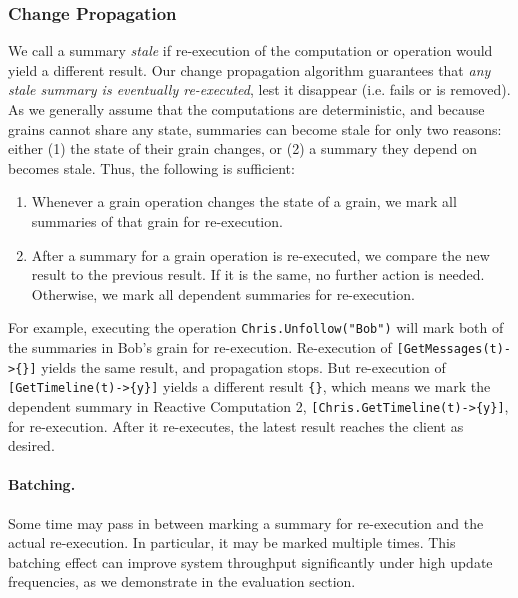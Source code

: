 \subsubsection{Change Propagation}\label{sec:cp}

We call a summary \emph{stale} if re-execution of the computation or operation would yield a different result. Our change propagation algorithm guarantees that \emph{any stale summary is eventually re-executed}, lest it disappear (i.e. fails or is removed). As we generally assume that the computations are deterministic, and because grains cannot share any state, summaries can become stale for only two reasons: either (1) the state of their grain changes, or (2) a summary they depend on becomes stale. Thus, the following is sufficient:
\begin{enumerate}
\item Whenever a grain operation changes the state of a grain, we mark all summaries of that grain for re-execution.
\item After a summary for a grain operation is re-executed, we compare the new result to the previous result. If it is the same, no further action is needed. Otherwise, we mark all dependent summaries for re-execution.
\end{enumerate}
 
\noindent For example, executing the operation \lstinline|Chris.Unfollow("Bob")| will mark both of the summaries in Bob's grain for re-execution. Re-execution of \lstinline|[GetMessages(t)->{}]| yields the same result, and propagation stops. But re-execution of \lstinline|[GetTimeline(t)->{y}]| yields a different result \lstinline|{}|, which means we mark the dependent summary in Reactive Computation 2, \lstinline|[Chris.GetTimeline(t)->{y}]|, for re-execution. After it re-executes, the latest result reaches the client as desired.

\paragraph{Batching. } Some time may pass in between marking a summary for re-execution and the actual re-execution. In particular, it may be marked multiple times. This batching effect can improve system throughput significantly under high update frequencies, as we demonstrate in the evaluation section.


